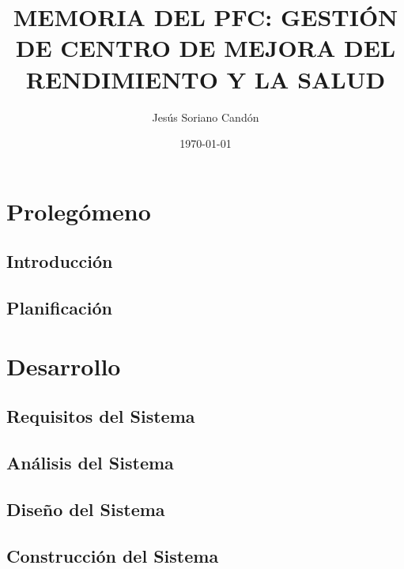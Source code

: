 \documentclass[a4paper,11pt]{book}
\title{MEMORIA DEL PFC: GESTIÓN DE CENTRO DE MEJORA DEL RENDIMIENTO Y LA SALUD}
\author{Jesús Soriano Candón}
\date{\today}
\begin{document}
\pagestyle{plain}


\cleardoublepage


\cleardoublepage


\newpage


\newpage


\frontmatter

\tableofcontents
\listoffigures
\listoftables

\mainmatter

\part{Prolegómeno}
\null\vfill

\chapter{Introducción}


\chapter{Planificación}


\part{Desarrollo}
\null\vfill

\chapter{Requisitos del Sistema}


\chapter{Análisis del Sistema}


\chapter{Diseño del Sistema}


\chapter{Construcción del Sistema}

\end{document}
